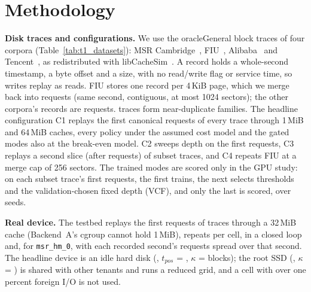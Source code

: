 
\section{Methodology}\label{sec:method}



\textbf{Disk traces and configurations.} We use the \diskTraces{} oracleGeneral
block traces of four corpora (Table~\ref{tab:t1_datasets}): MSR
Cambridge~\cite{narayanan2008write}, FIU~\cite{koller2010iodedup},
Alibaba~\cite{li2020alibaba} and Tencent~\cite{zhang2020osca,snia_tencent_cbs},
as redistributed with libCacheSim~\cite{libcachesim,cmupdl_cachedatasets,
yang2020twemcache}. A record holds a whole-second timestamp, a byte offset and
a size, with no read/write flag or service time, so writes replay as reads.
FIU stores one record per 4\,KiB page, which we merge back into requests
(same second, contiguous, at most 1024 sectors); the other corpora's records
are requests. \corpusTwinTraces{} traces form near-duplicate families. The
headline configuration C1 replays the first \diskSliceCOne{} canonical requests
of every trace through 1\,MiB and 64\,MiB caches, every policy under the assumed
cost model and the gated modes also at the break-even model. C2 sweeps depth
on the first \diskSliceCTwo{} requests, C3 replays a second slice (after
\diskSkipCThree{} requests) of \corpusPaperSubset{} subset traces, and C4 repeats
FIU at a merge cap of 256 sectors. The trained modes are scored only in the GPU
study: on each subset trace's first \ldPrefixMax{} requests, the first
\ldTrainShare{} trains, the next \ldValShare{} selects thresholds and the
validation-chosen fixed depth (VCF), and only the last \ldTestShare{} is
scored, over \ldSeedsCapTwoHundredFiftySix{} seeds.

\textbf{Real device.} The testbed replays the first \realioRequests{} requests
of \realioTraces{} traces through a 32\,MiB cache (Backend~A's cgroup cannot
hold 1\,MiB), \realioReps{} repeats per cell, in a closed loop and, for
\texttt{msr\_hm\_0}, with each recorded second's requests spread over that
second. The headline device is an idle hard disk (\deviceSdbModel,
$t_{pos}$ = \deviceSdbTPos, $\kappa$ = \deviceSdbKappa{} blocks); the root SSD
(\deviceSsdModel, $\kappa$ = \deviceSsdKappa) is shared with other tenants and
runs a reduced grid, and a cell with over one percent foreign I/O is not used.

